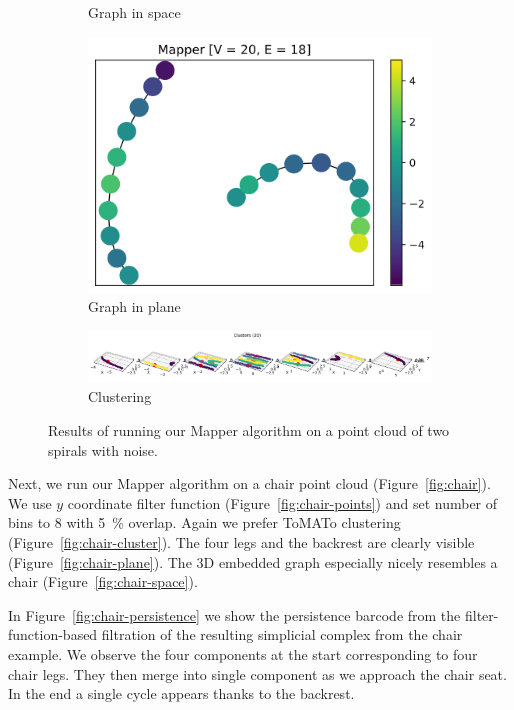 \documentclass{article}
\begin{document}
\begin{figure}[ht]
\begin{subfigure}[c]{0.3\columnwidth}
        \caption{Graph in space}
        \label{fig:spirals-space}
    \end{subfigure}
    \begin{subfigure}[c]{0.3\columnwidth}
        \centering
        \includegraphics[width=\textwidth]{spirals-graph-2d}
        \caption{Graph in plane}
        \label{fig:spirals-plane}
    \end{subfigure}
    \begin{subfigure}[c]{0.9\columnwidth}
        \centering
        \includegraphics[width=\textwidth]{spirals-clusters}
        \caption{Clustering}
        \label{fig:spirals-cluster}
    \end{subfigure}
    \caption{Results of running our Mapper algorithm on a point cloud of two spirals with noise.}
    \label{fig:spirals}
\end{figure}

Next, we run our Mapper algorithm on a chair point cloud
(Figure~\ref{fig:chair}). We use $y$ coordinate filter function
(Figure~\ref{fig:chair-points}) and set number of bins to 8 with 5~\% overlap.
Again we prefer ToMATo clustering (Figure~\ref{fig:chair-cluster}). The four
legs and the backrest are clearly visible (Figure~\ref{fig:chair-plane}). The
3D embedded graph especially nicely resembles a chair (Figure~\ref{fig:chair-space}).

In Figure~\ref{fig:chair-persistence} we show the persistence barcode from the
filter-function-based filtration of the resulting simplicial complex from the
chair example. We observe the four components at the start corresponding to four
chair legs. They then merge into single component as we approach the chair seat.
In the end a single cycle appears thanks to the backrest.
\end{document}
